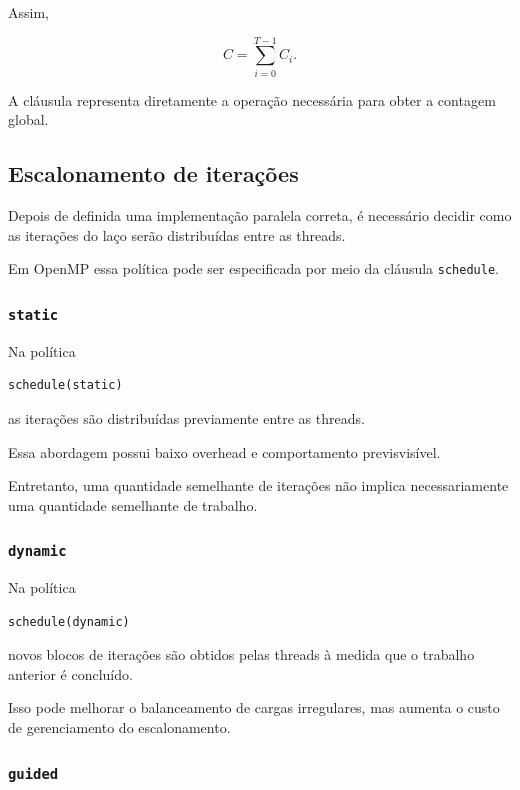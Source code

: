 Assim,

\[
C=\sum_{i=0}^{T-1}C_i.
\]

A cláusula representa diretamente a operação necessária para obter a
contagem global.


\subsection{Escalonamento de iterações}

Depois de definida uma implementação paralela correta, é necessário decidir
como as iterações do laço serão distribuídas entre as threads.

Em OpenMP essa política pode ser especificada por meio da cláusula
\texttt{schedule}.


\subsubsection{\texttt{static}}

Na política

\begin{verbatim}
schedule(static)
\end{verbatim}

as iterações são distribuídas previamente entre as threads.

Essa abordagem possui baixo overhead e comportamento previsvisível.

Entretanto, uma quantidade semelhante de iterações não implica
necessariamente uma quantidade semelhante de trabalho.


\subsubsection{\texttt{dynamic}}

Na política

\begin{verbatim}
schedule(dynamic)
\end{verbatim}

novos blocos de iterações são obtidos pelas threads à medida que o trabalho
anterior é concluído.

Isso pode melhorar o balanceamento de cargas irregulares, mas aumenta o
custo de gerenciamento do escalonamento.


\subsubsection{\texttt{guided}}

